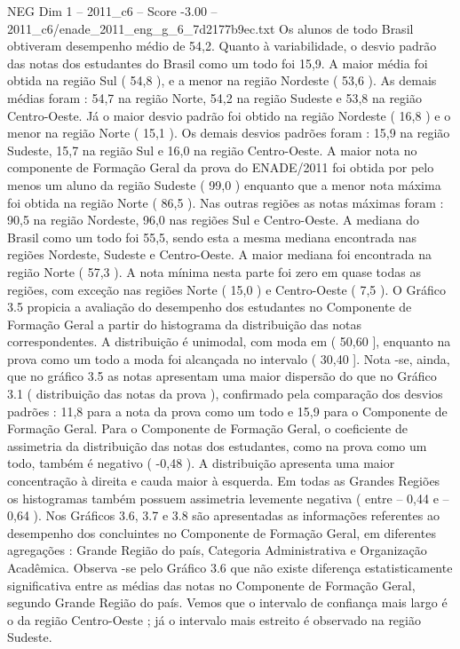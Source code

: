 \begin{textsample}{NEG Dim 1 – 2011\_c6 – Score -3.00 – 2011\_c6/enade\_2011\_eng\_g\_6\_7d2177b9ec.txt}
Os alunos de todo Brasil obtiveram desempenho médio de 54,2.
Quanto à variabilidade, o desvio padrão das notas dos estudantes do Brasil como um todo foi 15,9.
A maior média foi obtida na região Sul ( 54,8 ), e a menor na região Nordeste ( 53,6 ).
As demais médias foram : 54,7 na região Norte, 54,2 na região Sudeste e 53,8 na região Centro-Oeste.
Já o maior desvio padrão foi obtido na região Nordeste ( 16,8 ) e o menor na região Norte ( 15,1 ).
Os demais desvios padrões foram : 15,9 na região Sudeste, 15,7 na região Sul e 16,0 na região Centro-Oeste.
A maior nota no componente de Formação Geral da prova do ENADE/2011 foi obtida por pelo menos um aluno da região Sudeste ( 99,0 ) enquanto que a menor nota máxima foi obtida na região Norte ( 86,5 ).
Nas outras regiões as notas máximas foram : 90,5 na região Nordeste, 96,0 nas regiões Sul e Centro-Oeste.
A mediana do Brasil como um todo foi 55,5, sendo esta a mesma mediana encontrada nas regiões Nordeste, Sudeste e Centro-Oeste.
A maior mediana foi encontrada na região Norte ( 57,3 ).
A nota mínima nesta parte foi zero em quase todas as regiões, com exceção nas regiões Norte ( 15,0 ) e Centro-Oeste ( 7,5 ).
O Gráfico 3.5 propicia a avaliação do desempenho dos estudantes no Componente de Formação Geral a partir do histograma da distribuição das notas correspondentes.
A distribuição é unimodal, com moda em ( 50,60 ], enquanto na prova como um todo a moda foi alcançada no intervalo ( 30,40 ].
Nota -se, ainda, que no gráfico 3.5 as notas apresentam uma maior dispersão do que no Gráfico 3.1 ( distribuição das notas da prova ), confirmado pela comparação dos desvios padrões : 11,8 para a nota da prova como um todo e 15,9 para o Componente de Formação Geral.
Para o Componente de Formação Geral, o coeficiente de assimetria da distribuição das notas dos estudantes, como na prova como um todo, também é negativo ( -0,48 ).
A distribuição apresenta uma maior concentração à direita e cauda maior à esquerda.
Em todas as Grandes Regiões os histogramas também possuem assimetria levemente negativa ( entre – 0,44 e – 0,64 ).
Nos Gráficos 3.6, 3.7 e 3.8 são apresentadas as informações referentes ao desempenho dos concluintes no Componente de Formação Geral, em diferentes agregações : Grande Região do país, Categoria Administrativa e Organização Acadêmica.
Observa -se pelo Gráfico 3.6 que não existe diferença estatisticamente significativa entre as médias das notas no Componente de Formação Geral, segundo Grande Região do país.
Vemos que o intervalo de confiança mais largo é o da região Centro-Oeste ; já o intervalo mais estreito é observado na região Sudeste.

\end{textsample}
